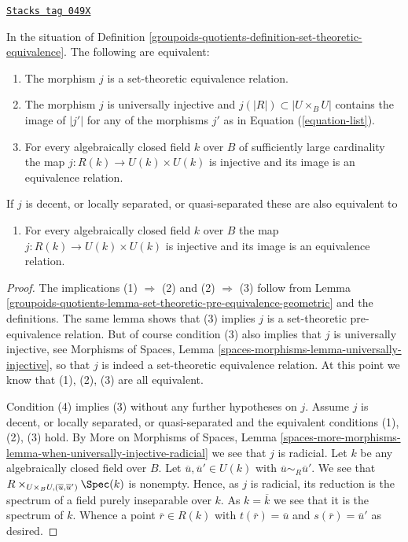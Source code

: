 \begin{lemma}
\label{groupoids-quotients-lemma-set-theoretic-equivalence-geometric}
\href{https://stacks.math.columbia.edu/tag/049X}{\texttt{Stacks tag 049X}}

In the situation of Definition \ref{groupoids-quotients-definition-set-theoretic-equivalence}.
The following are equivalent:
\begin{enumerate}
\item The morphism $j$ is a set-theoretic equivalence relation.
\item The morphism $j$ is universally injective and
$j(|R|) \subset |U \times_B U|$ contains the image of
$|j'|$ for any of the morphisms $j'$ as in Equation (\ref{equation-list}).
\item For every algebraically closed field $k$ over $B$ of sufficiently large
cardinality the map $j : R(k) \to U(k) \times U(k)$ is injective and
its image is an equivalence relation.
\end{enumerate}
If $j$ is decent, or locally separated, or quasi-separated
these are also equivalent to
\begin{enumerate}
\item[(4)] For every algebraically closed field $k$ over $B$
the map $j : R(k) \to U(k) \times U(k)$ is injective and its image
is an equivalence relation.
\end{enumerate}
\end{lemma}

\begin{proof}
The implications (1) $\Rightarrow$ (2) and (2) $\Rightarrow$ (3) follow from
Lemma \ref{groupoids-quotients-lemma-set-theoretic-pre-equivalence-geometric}
and the definitions. The same lemma shows that (3) implies
$j$ is a set-theoretic pre-equivalence relation. But of course condition
(3) also implies that $j$ is universally injective, see
Morphisms of Spaces, Lemma \ref{spaces-morphisms-lemma-universally-injective},
so that $j$ is indeed a set-theoretic equivalence relation.
At this point we know that (1), (2), (3) are all equivalent.

\medskip\noindent
Condition (4) implies (3) without any further hypotheses on $j$. Assume $j$
is decent, or locally separated, or quasi-separated and the equivalent
conditions (1), (2), (3) hold. By
More on Morphisms of Spaces,
Lemma \ref{spaces-more-morphisms-lemma-when-universally-injective-radicial}
we see that $j$ is radicial.
Let $k$ be any algebraically closed field over $B$. Let
$\overline{u}, \overline{u}' \in U(k)$ with
$\overline{u} \sim_R \overline{u}'$. We see that
$R \times_{U \times_B U, (\overline{u}, \overline{u}')} \Spec(k)$
is nonempty. Hence, as $j$ is radicial, its reduction is the spectrum of a
field purely inseparable over $k$. As $k = \overline{k}$ we see that
it is the spectrum of $k$. Whence a point $\overline{r} \in R(k)$
with $t(\overline{r}) = \overline{u}$ and $s(\overline{r}) = \overline{u}'$
as desired.
\end{proof}

